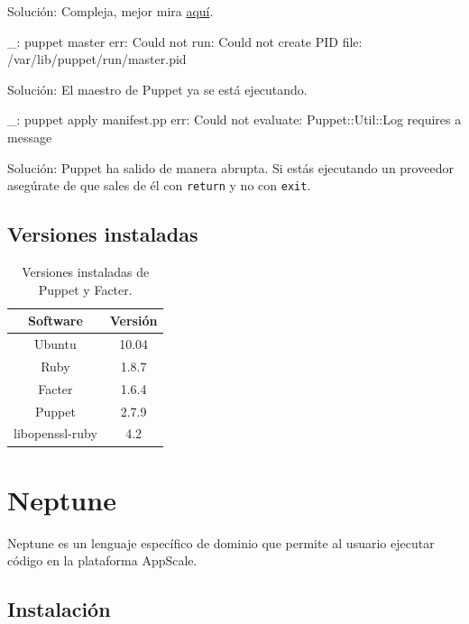 Solución: Compleja, mejor mira \href{http://projects.puppetlabs.com/projects/1/wiki/Certificates_And_Security}{aquí}.

\begin{bashcode}
_: puppet master
err: Could not run: Could not create PID file: /var/lib/puppet/run/master.pid
\end{bashcode}

Solución: El maestro de Puppet ya se está ejecutando.

\begin{bashcode}
_: puppet apply manifest.pp
err: Could not evaluate: Puppet::Util::Log requires a message
\end{bashcode}

Solución: Puppet ha salido de manera abrupta. Si estás ejecutando un proveedor asegúrate de que sales de él con \texttt{return} y no con \texttt{exit}.


\subsection{Versiones instaladas}

\begin{table}[!htbp]
\centering
   \begin{tabular}{|c|c|}
      \hline
      \textbf{Software} & \textbf{Versión} \\ \hline
      Ubuntu & 10.04 \\ \hline
      Ruby   & 1.8.7 \\ \hline
      Facter & 1.6.4 \\ \hline
      Puppet & 2.7.9 \\ \hline
      libopenssl-ruby &	4.2 \\ \hline
   \end{tabular}
\caption{Versiones instaladas de Puppet y Facter.}
\label{table:puppet-versions}
\end{table}


\section{Neptune}
\label{anx:inst-neptune}


Neptune es un lenguaje específico de dominio que permite al usuario ejecutar código en la plataforma AppScale.


\subsection{Instalación}

